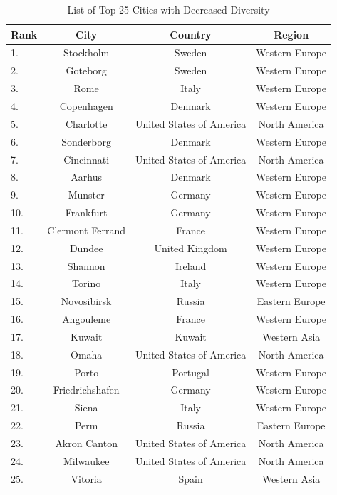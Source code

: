 \begin{table}[h]
	\centering
	\caption{List of Top 25 Cities with Decreased Diversity}
	\begin{scriptsize}
	\begin{tabular}{|l|c|c|c|}
	\hline \textbf{Rank} & \textbf{City} & \textbf{Country} & \textbf{Region} 			 \\   
	\hline 
	 1. & Stockholm         & Sweden 							& Western Europe  		\\	
	 2. & Goteborg      	& Sweden 							& Western Europe  		\\	
	 3. & Rome 				& Italy 							& Western Europe  		\\	
	 4. & Copenhagen 		& Denmark 							& Western Europe 		\\	
	 5. & Charlotte 		& United States of America			& North America			\\	
	 6. & Sonderborg 		& Denmark 							& Western Europe 		\\	
	 7. & Cincinnati 		& United States of America			& North America			\\	
	 8. & Aarhus 			& Denmark 							& Western Europe 		\\	
	 9. & Munster 			& Germany 							& Western Europe		\\	
	 10. & Frankfurt 		& Germany 							& Western Europe		\\	
	 11. & Clermont Ferrand & France 							& Western Europe		\\	
	 12. & Dundee			& United Kingdom		 			& Western Europe		\\	
	 13. & Shannon 			& Ireland 							& Western Europe  		\\	
	 14. & Torino	 		& Italy				 				& Western Europe		\\ 
	 15. & Novosibirsk		& Russia 							& Eastern Europe		\\ 				
	 16. & Angouleme		& France 							& Western Europe		\\	
	 17. & Kuwait 			& Kuwait	 						& Western Asia	  		\\
	 18. & Omaha 			& United States of America  		& North America   		\\
	 19. & Porto 			& Portugal							& Western Europe  		\\
	 20. & Friedrichshafen 	& Germany 							& Western Europe  		\\
	 21. & Siena 			& Italy 							& Western Europe		\\
	 22. & Perm 			& Russia		 					& Eastern Europe 		\\
	 23. & Akron Canton		& United States of America  		& North America 		\\
	 24. & Milwaukee 		& United States of America  		& North America   		\\
	 25. & Vitoria 			& Spain  							& Western Asia  		\\
	\hline
	\end{tabular} 
	\end{scriptsize}
	\label{tab:appendix-B-diversity-decreasing}
\end{table}


